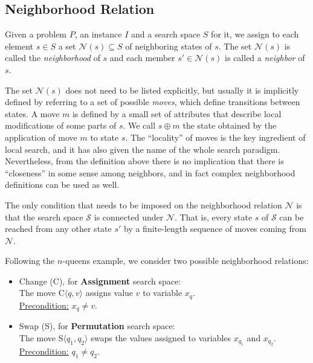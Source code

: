 \subsection{Neighborhood Relation}

Given a problem $P$, an instance $I$ and a search space $S$ for it, we
assign to each element $s\in S$ a set $\mathcal{N}(s) \subseteq S$ of
neighboring states of $s$. The set $\mathcal{N}(s)$ is called the
\emph{neighborhood} of $s$ and each member $s'\in \mathcal{N}(s)$ is
called a \emph{neighbor} of $s$.

The set $\mathcal{N}(s)$ does not need to be listed explicitly, but usually
it is implicitly defined by referring to a set of possible
\emph{moves}, which define transitions between states. A move $m$
is defined by a small set of attributes that describe local
modifications of some parts of $s$. We call $s \oplus m$ the state
obtained by the application of move $m$ to state $s$. The ``locality''
of moves is the key ingredient of local search, and it has
also given the name of the whole search paradigm. Nevertheless, from
the definition above there is no implication that there is
``closeness'' in some sense among neighbors, and in fact complex
neighborhood definitions can be used as well.

The only condition that needs to be imposed on the neighborhood relation
$\mathcal{N}$ is that the search space $\mathcal{S}$ is connected
under $\mathcal{N}$. That is, every state $s$ of $\mathcal{S}$ can be
reached from any other state $s'$ by a finite-length sequence of moves
coming from $\mathcal{N}$.

Following the $n$-queens example, we consider two possible
neighborhood relations:

\begin{itemize}\itemsep 2mm
\item \textsf{Change} (\textsf{C}), for \textbf{Assignment} search space:\\
  The move \textsf{C}$\langle q,v\rangle$ assigns value $v$ to variable $x_q$.\\
  \underline{Precondition:} $x_q \neq v$.\\
  
\item \textsf{Swap} (\textsf{S}), for \textbf{Permutation} search space:\\
The move \textsf{S}$\langle q_1,q_2\rangle$ swaps the  values assigned to variables $x_{q_1}$ and $x_{q_2}$.\\
\underline{Precondition:} $q_1\neq q_2$.\\
\end{itemize}

